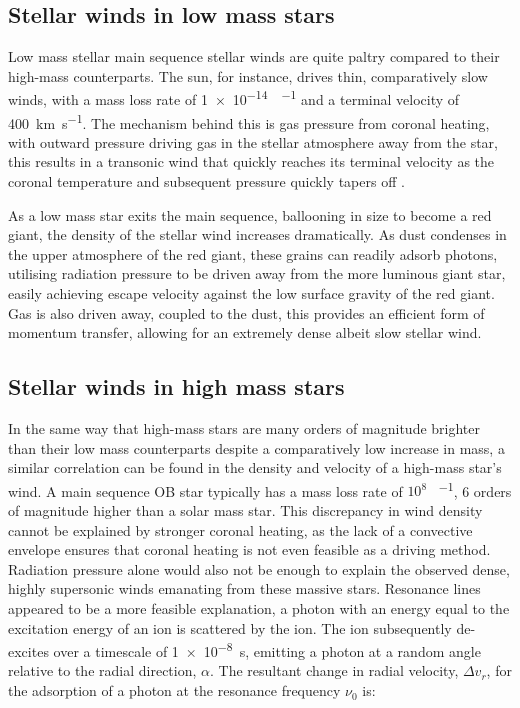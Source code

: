\subsection{Stellar winds in low mass stars}
\label{sec:lowmasswinds}



Low mass stellar main sequence stellar winds are quite paltry compared to their high-mass counterparts.
The sun, for instance, drives thin, comparatively slow winds, with a mass loss rate of \SI{1e-14}{\solarmass\per\year} and a terminal velocity of \SI{400}{\kilo\metre\per\second}.
The mechanism behind this is gas pressure from coronal heating, with outward pressure driving gas in the stellar atmosphere away from the star, this results in a transonic wind that quickly reaches its terminal velocity as the coronal temperature and subsequent pressure quickly tapers off \parencite{lamersIntroductionStellarWinds1999}.


As a low mass star exits the main sequence, ballooning in size to become a red giant, the density of the stellar wind increases dramatically. 
As dust condenses in the upper atmosphere of the red giant, these grains can readily adsorb photons, utilising radiation pressure to be driven away from the more luminous giant star, easily achieving escape velocity against the low surface gravity of the red giant.
Gas is also driven away, coupled to the dust, this provides an efficient form of momentum transfer, allowing for an extremely dense albeit slow stellar wind.

\subsection{Stellar winds in high mass stars}
\label{sec:radlinedriving}

In the same way that high-mass stars are many orders of magnitude brighter than their low mass counterparts despite a comparatively low increase in mass, a similar correlation can be found in the density and velocity of a high-mass star's wind.
A main sequence OB star typically has a mass loss rate of $10^{8}$ \si{\solarmass\per\year}, 6 orders of magnitude higher than a solar mass star.
This discrepancy in wind density cannot be explained by stronger coronal heating, as the lack of a convective envelope ensures that coronal heating is not even feasible as a driving method.
Radiation pressure alone would also not be enough to explain the observed dense, highly supersonic winds emanating from these massive stars.
Resonance lines appeared to be a more feasible explanation, a photon with an energy equal to the excitation energy of an ion is scattered by the ion.
The ion subsequently de-excites over a timescale of \SI{1e-8}{\second}, emitting a photon at a random angle relative to the radial direction, $\alpha$. The resultant change in radial velocity, $\Delta v_r$, for the adsorption of a photon at the resonance frequency $\nu_0$ is:

